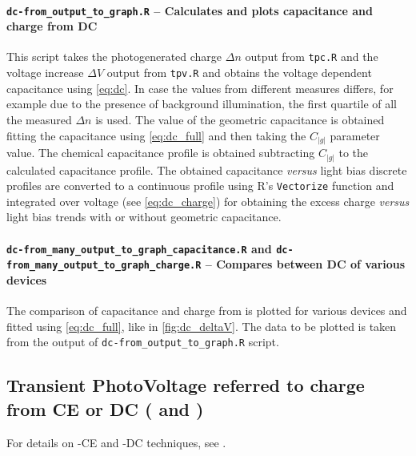 		\paragraph{\texttt{dc-\-from\_output\_to\_graph.R} -- Calculates and plots capacitance and charge from DC}
		This script takes the photogenerated charge $\Delta n$ output from \texttt{tpc.R} and the voltage increase $\Delta V$ output from \texttt{tpv.R} and obtains the voltage dependent capacitance using \cref{eq:dc}.
		In case the values from different  measures differs, for example due to the presence of background illumination, the first quartile of all the measured $\Delta n$ is used.
		The value of the geometric capacitance is obtained fitting the capacitance using \cref{eq:dc_full} and then taking the $C_|g|$ parameter value.
		The chemical capacitance profile is obtained subtracting $C_|g|$ to the calculated capacitance profile.
		The obtained capacitance \textsl{versus} light bias discrete profiles are converted to a continuous profile using R's \texttt{Vectorize} function and integrated over voltage (see \cref{eq:dc_charge}) for obtaining the excess charge \textsl{versus} light bias trends with or without geometric capacitance.

		\paragraph{\texttt{dc-from\_many\_output\_to\_graph\_capacitance.R} and \texttt{dc-\-from\_many\_output\_to\_graph\_charge.R} -- Compares between DC of various devices}
		The comparison of capacitance and charge from  is plotted for various devices and fitted using \cref{eq:dc_full}, like in \cref{fig:dc_deltaV}.
		The data to be plotted is taken from the output of \texttt{dc-\-from\_output\_to\_graph.R} script.

	\subsection{Transient PhotoVoltage referred to charge from CE or DC ( and )}\label{r_tpvcedc}
		For details on -CE and -DC techniques, see .


